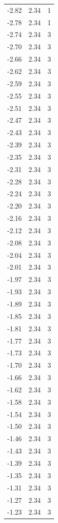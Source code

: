 \begin{longtable}{lrr}
  -2.82 & 2.34 & 1 \\
  -2.78 & 2.34 & 1 \\
  -2.74 & 2.34 & 3 \\
  -2.70 & 2.34 & 3 \\
  -2.66 & 2.34 & 3 \\
  -2.62 & 2.34 & 3 \\
  -2.59 & 2.34 & 3 \\
  -2.55 & 2.34 & 3 \\
  -2.51 & 2.34 & 3 \\
  -2.47 & 2.34 & 3 \\
  -2.43 & 2.34 & 3 \\
  -2.39 & 2.34 & 3 \\
  -2.35 & 2.34 & 3 \\
  -2.31 & 2.34 & 3 \\
  -2.28 & 2.34 & 3 \\
  -2.24 & 2.34 & 3 \\
  -2.20 & 2.34 & 3 \\
  -2.16 & 2.34 & 3 \\
  -2.12 & 2.34 & 3 \\
  -2.08 & 2.34 & 3 \\
  -2.04 & 2.34 & 3 \\
  -2.01 & 2.34 & 3 \\
  -1.97 & 2.34 & 3 \\
  -1.93 & 2.34 & 3 \\
  -1.89 & 2.34 & 3 \\
  -1.85 & 2.34 & 3 \\
  -1.81 & 2.34 & 3 \\
  -1.77 & 2.34 & 3 \\
  -1.73 & 2.34 & 3 \\
  -1.70 & 2.34 & 3 \\
  -1.66 & 2.34 & 3 \\
  -1.62 & 2.34 & 3 \\
  -1.58 & 2.34 & 3 \\
  -1.54 & 2.34 & 3 \\
  -1.50 & 2.34 & 3 \\
  -1.46 & 2.34 & 3 \\
  -1.43 & 2.34 & 3 \\
  -1.39 & 2.34 & 3 \\
  -1.35 & 2.34 & 3 \\
  -1.31 & 2.34 & 3 \\
  -1.27 & 2.34 & 3 \\
  -1.23 & 2.34 & 3 \\

\end{longtable}
